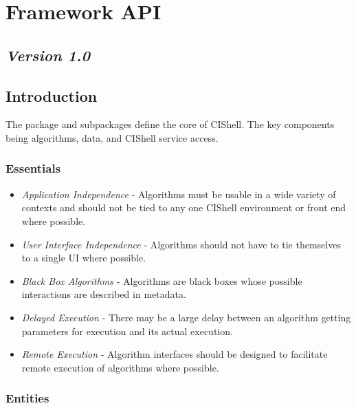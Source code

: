 \chapter{Framework API}

\section*{\textit{Version 1.0}}

\section{Introduction}

The  package and subpackages define the core of
CIShell. The key components being algorithms, data, and CIShell service access.

\subsection{Essentials}
\begin{itemize}
  \item \textit{Application Independence} - Algorithms must be usable in a wide
  variety of contexts and should not be tied to any one CIShell environment or
  front end where possible.
  \item \textit{User Interface Independence} - Algorithms should not have to tie
  themselves to a single UI where possible.
  \item \textit{Black Box Algorithms} - Algorithms are black boxes whose
  possible interactions are described in metadata.
  \item \textit{Delayed Execution} - There may be a large delay between an
  algorithm getting parameters for execution and its actual execution.
  \item \textit{Remote Execution} - Algorithm interfaces should be designed to
  facilitate remote execution of algorithms where possible.
\end{itemize}

\subsection{Entities}

